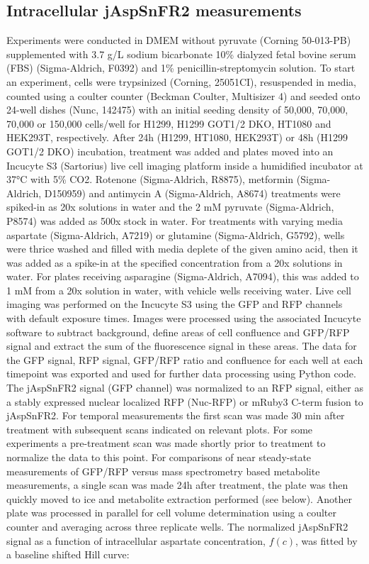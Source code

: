 \documentclass[9pt,lineno]{elife}
\begin{document}
\subsection{Intracellular jAspSnFR2 measurements}
Experiments were conducted in DMEM without pyruvate (Corning 50-013-PB) supplemented with 3.7 g/L sodium bicarbonate 10\% dialyzed fetal bovine serum (FBS) (Sigma-Aldrich, F0392) and 1\% penicillin-streptomycin solution.
To start an experiment, cells were trypsinized (Corning, 25051CI), resuspended in media, counted using a coulter counter (Beckman Coulter, Multisizer 4) and seeded onto 24-well dishes (Nunc, 142475) with an initial seeding density of 50,000, 70,000, 70,000 or 150,000 cells/well for H1299, H1299 GOT1/2 DKO, HT1080 and HEK293T, respectively.
After 24h (H1299, HT1080, HEK293T) or 48h (H1299 GOT1/2 DKO) incubation, treatment was added and plates moved into an Incucyte S3 (Sartorius) live cell imaging platform inside a humidified incubator at 37°C with 5\% CO2.
Rotenone (Sigma-Aldrich, R8875), metformin (Sigma-Aldrich, D150959) and antimycin A (Sigma-Aldrich, A8674) treatments were spiked-in as 20x solutions in water and the 2 mM pyruvate (Sigma-Aldrich, P8574) was added as 500x stock in water.
For treatments with varying media aspartate (Sigma-Aldrich, A7219) or glutamine (Sigma-Aldrich, G5792), wells were thrice washed and filled with media deplete of the given amino acid, then it was added as a spike-in at the specified concentration from a 20x solutions in water.
For plates receiving asparagine (Sigma-Aldrich, A7094), this was added to 1 mM from a 20x solution in water, with vehicle wells receiving water.
Live cell imaging was performed on the Incucyte S3 using the GFP and RFP channels with default exposure times.
Images were processed using the associated Incucyte software to subtract background, define areas of cell confluence and GFP/RFP signal and extract the sum of the fluorescence signal in these areas.
The data for the GFP signal, RFP signal, GFP/RFP ratio and confluence for each well at each timepoint was exported and used for further data processing using Python code.
The jAspSnFR2 signal (GFP channel) was normalized to an RFP signal, either as a stably expressed nuclear localized RFP (Nuc-RFP) or mRuby3 C-term fusion to jAspSnFR2.
For temporal measurements the first scan was made 30 min after treatment with subsequent scans indicated on relevant plots.
For some experiments a pre-treatment scan was made shortly prior to treatment to normalize the data to this point.
For comparisons of near steady-state measurements of GFP/RFP versus mass spectrometry based metabolite measurements, a single scan was made 24h after treatment, the plate was then quickly moved to ice and metabolite extraction performed (see below).
Another plate was processed in parallel for cell volume determination using a coulter counter and averaging across three replicate wells.
The normalized jAspSnFR2 signal as a function of intracellular aspartate concentration, $f(c)$, was fitted by a baseline shifted Hill curve:
\end{document}
